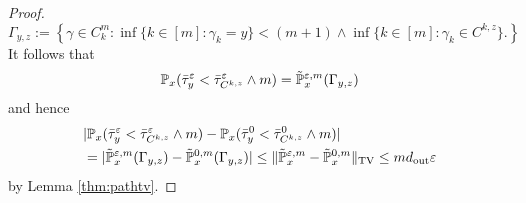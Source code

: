 \begin{proof}
\begin{equation*}
\Gamma_{y,z}:= \left\{\gamma\in C_k^m: \inf\{k\in[m]: \gamma_k=y\} < (m+1)\wedge \inf\{k\in[m]: \gamma_k\in C^{k,z}\}.\right\}
\end{equation*}
It follows that
\begin{align*}
\mathbb{P}_x(\bar{\tau}_y^\varepsilon < \bar{\tau}_{C^{k,z}}^\varepsilon\wedge m) = \tilde{\mathbb{P}}_x^{\varepsilon,m}(\Gamma_{y,z})
\end{align*}
and hence
\begin{align*}
&|\mathbb{P}_x(\bar{\tau}_y^\varepsilon < \bar{\tau}_{C^{k,z}}^\varepsilon\wedge m) - \mathbb{P}_x(\bar{\tau}_y^0 < \bar{\tau}_{C^{k,z}}^0\wedge m)|\\
&= |\tilde{\mathbb{P}}_x^{\varepsilon,m}(\Gamma_{y,z}) - \tilde{\mathbb{P}}_x^{0,m}(\Gamma_{y,z})| \le \lVert\tilde{\mathbb{P}}_x^{\varepsilon,m} - \tilde{\mathbb{P}}_x^{0,m}\rVert_{\operatorname{TV}} \le md_{\operatorname{out}}\varepsilon
\end{align*}
by Lemma \ref{thm:pathtv}.


\end{proof}
